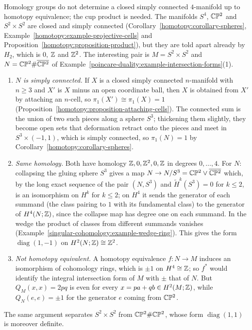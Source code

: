 \begin{counterexample}\label{poincare-duality:counterexample-four-manifolds}
Homology groups do not determine a closed simply connected $4$-manifold up to homotopy equivalence; the cup product is needed. The manifolds $S^4$, $\mathbb{C}\mathbb{P}^2$
and $S^2 \times S^2$ are closed and simply connected (Corollary~\ref{homotopy:corollary-spheres}, Example~\ref{homotopy:example-projective-cells} and
Proposition~\ref{homotopy:proposition-product}), but they are told apart already by $H_2$, which is $0$, $\mathbb{Z}$ and $\mathbb{Z}^2$. The interesting pair is
$M = S^2 \times S^2$ and $N = \mathbb{C}\mathbb{P}^2 \# \overline{\mathbb{C}\mathbb{P}^2}$ of Example~\ref{poincare-duality:example-intersection-forms}(1).
\begin{enumerate}
\item \emph{$N$ is simply connected.} If $X$ is a closed simply connected $n$-manifold with $n \geq 3$ and $X'$ is $X$ minus an open coordinate ball, then $X$ is obtained
from $X'$ by attaching an $n$-cell, so $\pi_1(X') \cong \pi_1(X) = 1$ (Proposition~\ref{homotopy:proposition-attaching-cells}). The connected sum is the union of two
such pieces along a sphere $S^3$; thickening them slightly, they become open sets that deformation retract onto the pieces and meet in $S^3 \times (-1, 1)$, which is
simply connected, so $\pi_1(N) = 1$ by Corollary~\ref{homotopy:corollary-spheres}.
\item \emph{Same homology.} Both have homology $\mathbb{Z}, 0, \mathbb{Z}^2, 0, \mathbb{Z}$ in degrees $0, \ldots, 4$. For $N$: collapsing the gluing sphere $S^3$ gives a map
$N \to N/S^3 = \mathbb{C}\mathbb{P}^2 \vee \overline{\mathbb{C}\mathbb{P}^2}$ which, by the long exact sequence of the pair $(N, S^3)$ and $\tilde{H}^k(S^3) = 0$ for $k \leq 2$, is an isomorphism
on $H^k$ for $k \leq 2$; on $H^4$ it sends the generator of each summand (the class pairing to $1$ with its fundamental class) to the generator of
$H^4(N; \mathbb{Z})$, since the collapse map has degree one on each summand. In the wedge the product of classes from different summands vanishes
(Example~\ref{singular-cohomology:example-wedge-ring}). This gives the form $\operatorname{diag}(1, -1)$ on $H^2(N; \mathbb{Z}) \cong \mathbb{Z}^2$.
\item \emph{Not homotopy equivalent.} A homotopy equivalence $f \colon N \to M$ induces an isomorphism of cohomology rings, which is $\pm 1$ on
$H^4 \cong \mathbb{Z}$; so $f^*$ would identify the integral intersection form of $M$ with $\pm$ that of $N$. But $Q_M(x, x) = 2pq$ is even for every
$x = pa + qb \in H^2(M; \mathbb{Z})$, while $Q_N(e, e) = \pm 1$ for the generator $e$ coming from $\mathbb{C}\mathbb{P}^2$.
\end{enumerate}
The same argument separates $S^2 \times S^2$ from $\mathbb{C}\mathbb{P}^2 \# \mathbb{C}\mathbb{P}^2$, whose form $\operatorname{diag}(1, 1)$ is moreover definite.
\end{counterexample}

